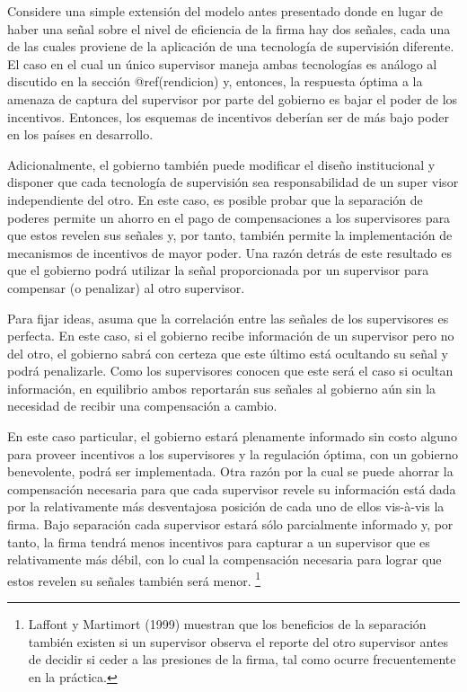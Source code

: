 \documentclass[
  12pt,
  spanish,
]{book}
\begin{document}
Considere una simple extensión del modelo antes presentado donde en
lugar de haber una señal sobre el nivel de eficiencia de la firma hay
dos señales, cada una de las cuales proviene de la aplicación de una
tecnología de supervisión diferente. El caso en el cual un único
supervisor maneja ambas tecnologías es análogo al discutido en la
sección @ref(rendicion) y, entonces, la respuesta óptima a la amenaza de
captura del supervisor por parte del gobierno es bajar el poder de los
incentivos. Entonces, los esquemas de incentivos deberían ser de más
bajo poder en los países en desarrollo.

Adicionalmente, el gobierno también puede modificar el diseño
institucional y disponer que cada tecnología de supervisión sea
responsabilidad de un super visor independiente del otro. En este caso,
es posible probar que la separación de poderes permite un ahorro en el
pago de compensaciones a los supervisores para que estos revelen sus
señales y, por tanto, también permite la implementación de mecanismos de
incentivos de mayor poder. Una razón detrás de este resultado es que el
gobierno podrá utilizar la señal proporcionada por un supervisor para
compensar (o penalizar) al otro supervisor.

Para fijar ideas, asuma que la correlación entre las señales de los
supervisores es perfecta. En este caso, si el gobierno recibe
información de un supervisor pero no del otro, el gobierno sabrá con
certeza que este último está ocultando su señal y podrá penalizarle.
Como los supervisores conocen que este será el caso si ocultan
información, en equilibrio ambos reportarán sus señales al gobierno aún
sin la necesidad de recibir una compensación a cambio.

En este caso particular, el gobierno estará plenamente informado sin
costo alguno para proveer incentivos a los supervisores y la regulación
óptima, con un gobierno benevolente, podrá ser implementada. Otra razón
por la cual se puede ahorrar la compensación necesaria para que cada
supervisor revele su información está dada por la relativamente más
desventajosa posición de cada uno de ellos vis-à-vis la firma. Bajo
separación cada supervisor estará sólo parcialmente informado y, por
tanto, la firma tendrá menos incentivos para capturar a un supervisor
que es relativamente más débil, con lo cual la compensación necesaria
para lograr que estos revelen su señales también será menor. \footnote{Laffont
  y Martimort (1999) muestran que los beneficios de la separación
  también existen si un supervisor observa el reporte del otro
  supervisor antes de decidir si ceder a las presiones de la firma, tal
  como ocurre frecuentemente en la práctica.}
\end{document}

